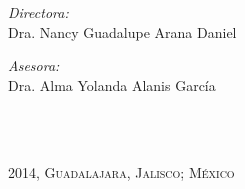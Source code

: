 \documentclass[letterpaper,openright,12pt]{book}
\newcommand{\HRule}{\rule{\linewidth}{0.5mm}}
\begin{document}
\begin{titlepage}

\begin{minipage}{0.5\textwidth}
\begin{center}
\emph{Directora:} \\
Dra. Nancy Guadalupe Arana Daniel
\end{center}
\end{minipage}
\begin{minipage}{0.5\textwidth}
\begin{center}
\emph{Asesora:} \\
Dra. Alma Yolanda Alanis García
\end{center}
\end{minipage}
\\[0.4cm]
\\[0.7cm]
\begin{center}
\small \textsc{2014, Guadalajara, Jalisco; México}
\end{center}
\end{titlepage}       



\newpage
\mbox{}
\thispagestyle{empty} 


\newpage
\mbox{}



\newpage
\mbox{}


\newpage
\mbox{}


\newpage
\mbox{}



\newpage

\chapter*{}



\end{document}
